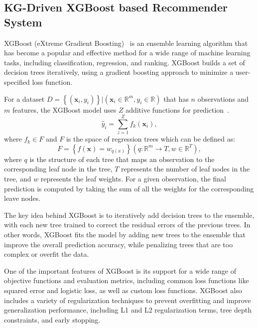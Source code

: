 \documentclass[11pt]{article}
\begin{document}
\subsection{KG-Driven XGBoost based Recommender System}
XGBoost (eXtreme Gradient Boosting)~\cite{10.1145/2939672.2939785} is an ensemble learning algorithm that has become a popular and effective method for a wide range of machine learning tasks, including classification, regression, and ranking. XGBoost builds a set of decision trees iteratively, using a gradient boosting approach to minimize a user-specified loss function.

For a dataset $D = \left\{ (\textbf{x}_{i}, y_{i}) \right\} |  
 (\textbf{x}_{i} \in \mathbb{R}^m, y_{i} \in \mathbb{R} )$ that has $n$ observations and $m$ features, the XGBoost model uses $Z$ additive functions for prediction~\cite{10.1145/2939672.2939785}.
\begin{equation}
\hat{y}_{i} = \sum_{z=1}^{Z} f_{k} (\textbf{x}_{i}),
\end{equation}
where $f_k \in F$ and $F$ is the space of regression trees which can be defined as:
\begin{equation}
F = \left\{f(\textbf{x}) = w_{q(x)} \right\} (q: \mathbb{R}^m \to T, w \in \mathbb{R}^T ),
\end{equation}
where $q$ is the structure of each tree that maps an observation to the corresponding leaf node in the tree, $T$ represents the number of leaf nodes in the tree, and $w$ represents the leaf weights. For a given observation, the final prediction is computed by taking the sum of all the weights for the corresponding leave nodes.

The key idea behind XGBoost is to iteratively add decision trees to the ensemble, with each new tree trained to correct the residual errors of the previous trees. In other words, XGBoost fits the model by adding new trees to the ensemble that improve the overall prediction accuracy, while penalizing trees that are too complex or overfit the data.

One of the important features of XGBoost is its support for a wide range of objective functions and evaluation metrics, including common loss functions like squared error and logistic loss, as well as custom loss functions. XGBoost also includes a variety of regularization techniques to prevent overfitting and improve generalization performance, including L1 and L2 regularization terms, tree depth constraints, and early stopping.
\end{document}
